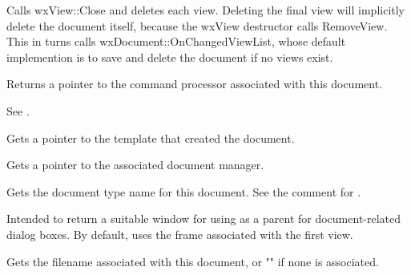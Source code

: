 Calls wxView::Close and deletes each view. Deleting the final view will implicitly
delete the document itself, because the wxView destructor calls RemoveView. This
in turns calls wxDocument::OnChangedViewList, whose default implemention is to
save and delete the document if no views exist.

\label{wxdocumentgetcommandprocessor}


Returns a pointer to the command processor associated with this document.

See .

\label{wxdocumentgetdocumenttemplate}


Gets a pointer to the template that created the document.

\label{wxdocumentgetdocumentmanager}


Gets a pointer to the associated document manager.

\label{wxdocumentgetdocumentname}


Gets the document type name for this document. See the comment for .

\label{wxdocumentgetdocumentwindow}


Intended to return a suitable window for using as a parent for document-related
dialog boxes. By default, uses the frame associated with the first view.

\label{wxdocumentgetfilename}


Gets the filename associated with this document, or "" if none is
associated.

\label{wxdocumentgetfirstview}


